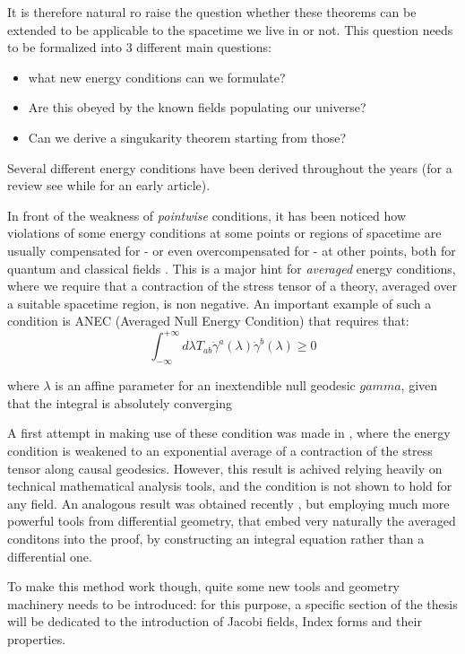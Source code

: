 \documentclass[12pt, a4paper]{article}
\begin{document}
It is therefore natural ro raise the question whether these theorems can be extended to be applicable to the spacetime we live in or not. This question needs to be formalized into \(3\) different main questions:
\begin{itemize}
	\item what new energy conditions can we formulate?
	\item Are this obeyed by the known fields populating our universe?
	\item  Can we derive a singukarity theorem starting from those?
\end{itemize}
Several different energy conditions have been derived throughout the years (for a review see \cite{kontou2020energy} while \cite{tipler1978energy} for an early article).

In front of the weakness of \emph{pointwise} conditions, it has been noticed how violations of some energy conditions at some points or regions of spacetime are usually compensated for - or even overcompensated for - at other points, both for quantum and classical fields \cite{ford1999quantum}.
This is a major hint for \emph{averaged} energy conditions, where we require that a contraction of the stress tensor of a theory, averaged over a suitable spacetime region, is non negative.
An important example of such a condition is ANEC (Averaged Null Energy Condition) that requires that:
\[
\int_{-\infty}^{+\infty} d\lambda T_{ab} \dot{\gamma}^a(\lambda) \dot{\gamma}^b(\lambda) \ge 0
\]

where \(\lambda\) is an affine parameter for an inextendible null geodesic \(gamma\), given that the integral is absolutely converging

A first attempt in making use of these condition was made in \cite{fewster2011singularity},
where the energy condition is weakened to an exponential average of a contraction of the stress tensor along causal geodesics.
However, this result is achived relying heavily on technical mathematical analysis tools, and the condition is not shown to hold for any field.
An analogous result was obtained recently \cite{fewster2020new}, but employing much more powerful tools from differential geometry, that embed very naturally the averaged conditons into the proof, by constructing an integral equation rather than a differential one.

To make this method work though, quite some new tools and geometry machinery needs to be introduced: for this purpose, a specific section of the thesis will be dedicated to the introduction of Jacobi fields, Index forms and their properties.
\end{document}

